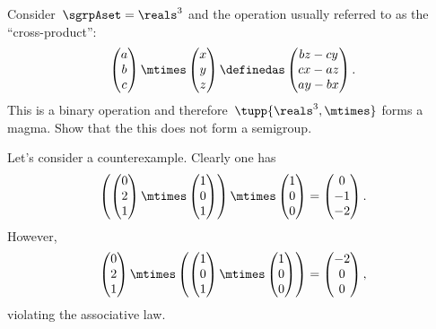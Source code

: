 \begin{exercise}
	\label{ex:cross_prod}
	Consider~$\sgrpAset=\reals^3$ and the operation usually referred to as the ``cross-product'':
	\begin{equation*}
		\begin{pmatrix}
			a \\ b\\ c
		\end{pmatrix}\mtimes \begin{pmatrix}
			x \\ y \\ z
		\end{pmatrix}\definedas
		\begin{pmatrix}
			bz-cy \\
			cx-az \\
			ay-bx
		\end{pmatrix}.
	\end{equation*}
	This is a binary operation and therefore~$\tupp{\reals^3,\mtimes}$ forms a magma.
	Show that the this does not form a semigroup.
\end{exercise}
%
\begin{solution}
	Let's consider a counterexample.
	Clearly one has
	\begin{equation}
		\left(\begin{pmatrix}
			0 \\ 2\\ 1
		\end{pmatrix}\mtimes \begin{pmatrix}
			1 \\ 0 \\ 1
		\end{pmatrix}\right)\mtimes
		\begin{pmatrix}
			1 \\ 0 \\ 0
		\end{pmatrix}=\begin{pmatrix}
			0 \\-1\\-2
		\end{pmatrix}.
	\end{equation}
	However,
	\begin{equation}
		\begin{pmatrix}
			0 \\ 2\\ 1
		\end{pmatrix}\mtimes \left(\begin{pmatrix}
			1 \\ 0 \\ 1
		\end{pmatrix}\mtimes
		\begin{pmatrix}
			1 \\ 0 \\ 0
		\end{pmatrix}\right)
		=\begin{pmatrix}
			-2 \\0\\0
		\end{pmatrix},
	\end{equation}
	violating the associative law.
\end{solution}

